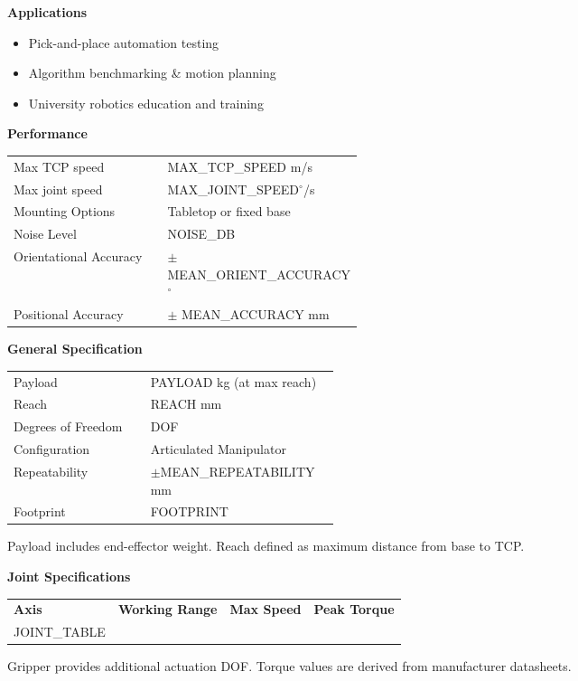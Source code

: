 \documentclass[a4paper,landscape,10pt]{article}
\newcommand{\sectitle}[1]{
    \vspace{0.4cm}
    \colorbox{rowcolor}{
        \parbox{\linewidth}{
            \textbf{\textcolor{maincolor}{#1}}
        }
    }
    \vspace{0.2cm}
}
\begin{document}
\begin{multicols}{3}
\sectitle{Applications}
\begin{itemize}[leftmargin=*, nosep]
    \item Pick-and-place automation testing
    \item Algorithm benchmarking \& motion planning
    \item University robotics education and training
\end{itemize}

\sectitle{Performance}

\colorbox{rowcolor}{
\parbox{\linewidth}{
\begin{tabularx}{\linewidth}{>{\raggedright\arraybackslash}p{0.45\linewidth} X}
Max TCP speed & {{MAX_TCP_SPEED}} m/s \\
Max joint speed & {{MAX_JOINT_SPEED}}$^\circ$/s \\
Mounting Options & Tabletop or fixed base\\
Noise Level & {{NOISE_DB}} \\
Orientational Accuracy & $\pm$ {{MEAN_ORIENT_ACCURACY}} $^\circ$\\
Positional Accuracy & $\pm$ {{MEAN_ACCURACY}} mm\\
\end{tabularx}
}
}

\vfill\null
\columnbreak

\sectitle{General Specification}

\colorbox{rowcolor}{
\parbox{\linewidth}{
\begin{tabularx}{\linewidth}{>{\raggedright\arraybackslash}p{0.42\linewidth} X}
Payload & {{PAYLOAD}} kg (at max reach) \\
Reach & {{REACH}} mm\\
Degrees of Freedom & {{DOF}} \\
Configuration & Articulated Manipulator \\
Repeatability & $\pm${{MEAN_REPEATABILITY}} mm \\
Footprint & {{FOOTPRINT}} \\
\end{tabularx}
}
}
\smallskip
{\footnotesize *Payload includes end-effector weight. Reach defined as maximum distance from base to TCP.}

\sectitle{Joint Specifications}

\colorbox{rowcolor}{
\parbox{\linewidth}{
\begin{tabularx}{\linewidth}{l X X X}
\textbf{Axis} & \textbf{Working Range} & \textbf{Max Speed} & \textbf{Peak Torque} \\
{{JOINT_TABLE}}
\end{tabularx}
}
}
\smallskip
{\footnotesize *Gripper provides additional actuation DOF. Torque values are derived from manufacturer datasheets.}


\end{multicols}
\end{document}
